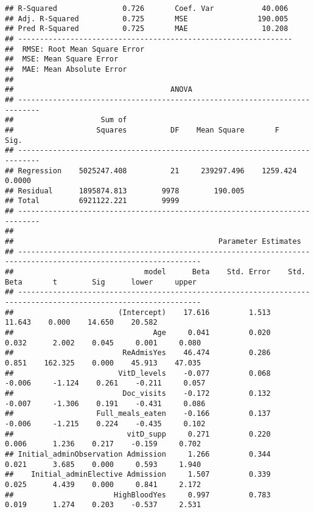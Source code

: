 \documentclass[
]{article}
\begin{document}
\begin{verbatim}
## R-Squared               0.726       Coef. Var           40.006 
## Adj. R-Squared          0.725       MSE                190.005 
## Pred R-Squared          0.725       MAE                 10.208 
## ---------------------------------------------------------------
##  RMSE: Root Mean Square Error 
##  MSE: Mean Square Error 
##  MAE: Mean Absolute Error 
## 
##                                    ANOVA                                    
## ---------------------------------------------------------------------------
##                    Sum of                                                  
##                   Squares          DF    Mean Square       F          Sig. 
## ---------------------------------------------------------------------------
## Regression    5025247.408          21     239297.496    1259.424    0.0000 
## Residual      1895874.813        9978        190.005                       
## Total         6921122.221        9999                                      
## ---------------------------------------------------------------------------
## 
##                                               Parameter Estimates                                                
## ----------------------------------------------------------------------------------------------------------------
##                              model      Beta    Std. Error    Std. Beta       t        Sig      lower     upper 
## ----------------------------------------------------------------------------------------------------------------
##                        (Intercept)    17.616         1.513                  11.643    0.000    14.650    20.582 
##                                Age     0.041         0.020        0.032      2.002    0.045     0.001     0.080 
##                         ReAdmisYes    46.474         0.286        0.851    162.325    0.000    45.913    47.035 
##                        VitD_levels    -0.077         0.068       -0.006     -1.124    0.261    -0.211     0.057 
##                         Doc_visits    -0.172         0.132       -0.007     -1.306    0.191    -0.431     0.086 
##                   Full_meals_eaten    -0.166         0.137       -0.006     -1.215    0.224    -0.435     0.102 
##                          vitD_supp     0.271         0.220        0.006      1.236    0.217    -0.159     0.702 
## Initial_adminObservation Admission     1.266         0.344        0.021      3.685    0.000     0.593     1.940 
##    Initial_adminElective Admission     1.507         0.339        0.025      4.439    0.000     0.841     2.172 
##                       HighBloodYes     0.997         0.783        0.019      1.274    0.203    -0.537     2.531 

\end{verbatim}
\end{document}
